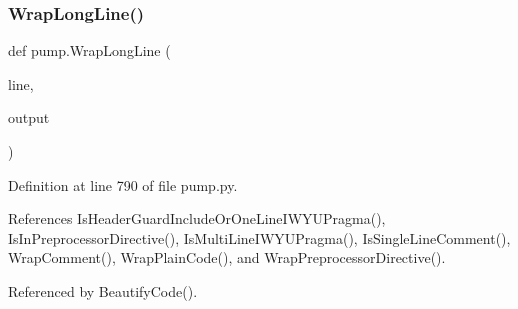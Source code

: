 \subsubsection{\texorpdfstring{Wrap\+Long\+Line()}{WrapLongLine()}}
{\footnotesize\ttfamily def pump.\+Wrap\+Long\+Line (\begin{DoxyParamCaption}\item[{}]{line,  }\item[{}]{output }\end{DoxyParamCaption})}



Definition at line 790 of file pump.\+py.



References Is\+Header\+Guard\+Include\+Or\+One\+Line\+I\+W\+Y\+U\+Pragma(), Is\+In\+Preprocessor\+Directive(), Is\+Multi\+Line\+I\+W\+Y\+U\+Pragma(), Is\+Single\+Line\+Comment(), Wrap\+Comment(), Wrap\+Plain\+Code(), and Wrap\+Preprocessor\+Directive().



Referenced by Beautify\+Code().


